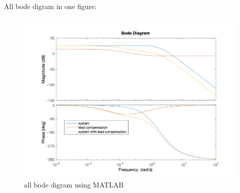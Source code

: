 All bode digram in one figure:
\begin{figure}[H]
	\caption{all bode digram using MATLAB}
	\centering
	\includegraphics[width=12cm]{../Figure/Q1/b/all_in_one.png}
\end{figure}